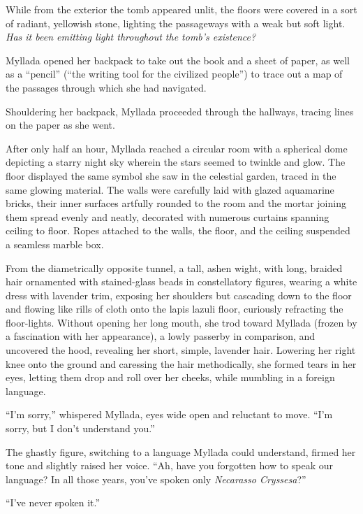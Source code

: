 While from the exterior the tomb appeared unlit, the floors were covered in a sort of radiant, yellowish stone, lighting the passageways with a weak but soft light. \emph{Has it been emitting light throughout the tomb's existence?}

Myllada opened her backpack to take out the book and a sheet of paper, as well as a ``pencil'' (``the writing tool for the civilized people'') to trace out a map of the passages through which she had navigated.

Shouldering her backpack, Myllada proceeded through the hallways, tracing lines on the paper as she went.

\centeredstars

After only half an hour, Myllada reached a circular room with a spherical dome depicting a starry night sky wherein the stars seemed to twinkle and glow. The floor displayed the same symbol she saw in the celestial garden, traced in the same glowing material. The walls were carefully laid with glazed aquamarine bricks, their inner surfaces artfully rounded to the room and the mortar joining them spread evenly and neatly, decorated with numerous curtains spanning ceiling to floor. Ropes attached to the walls, the floor, and the ceiling suspended a seamless marble box.

From the diametrically opposite tunnel, a tall, ashen wight, with long, braided hair ornamented with stained-glass beads in constellatory figures, wearing a white dress with lavender trim, exposing her shoulders but cascading down to the floor and flowing like rills of cloth onto the lapis lazuli floor, curiously refracting the floor-lights. Without opening her long mouth, she trod toward Myllada (frozen by a fascination with her appearance), a lowly passerby in comparison, and uncovered the hood, revealing her short, simple, lavender hair. Lowering her right knee onto the ground and caressing the hair methodically, she formed tears in her eyes, letting them drop and roll over her cheeks, while mumbling in a foreign language.

``I'm sorry,'' whispered Myllada, eyes wide open and reluctant to move. ``I'm sorry, but I don't understand you.''

The ghastly figure, switching to a language Myllada could understand, firmed her tone and slightly raised her voice. ``Ah, have you forgotten how to speak our language? In all those years, you've spoken only \emph{Necarasso Cryssesa}?''

``I've never spoken it.''

